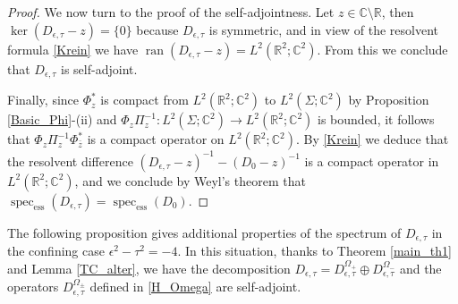 \documentclass[11pt,a4paper,reqno,oneside]{amsproc}
\DeclareMathOperator{\ran}{ran}
\DeclareMathOperator{\spec}{spec}
\newcommand{\spece}{\spec_\mathrm{ess}}
\def \rr {{\mathbb R}}
\def \cc {{\mathbb C}}
\numberwithin{equation}{section}
\def \cc {{\mathbb{C}}}
\begin{document}
\begin{proof}
We now turn to the proof of  the self-adjointness.  Let $z\in \cc\setminus\rr$, then $\ker (D_{\epsilon,\tau}-z)=\{0\}$ because $D_{\epsilon, \tau}$ is symmetric, and in view of the resolvent formula \eqref{Krein} we have $\ran (D_{\epsilon,\tau}-z)=L^2(\rr^2;\cc^2)$. From this we conclude that $D_{\epsilon,\tau}$ is self-adjoint. 

Finally,  since $\Phi_z^*$ is compact from $ L^2(\rr^2; \mathbb{C}^2)$ to $L^2(\Sigma; \mathbb{C}^2)$ by Proposition \ref{Basic_Phi}-(ii) and $\Phi_z\Pi_z^{-1}: L^2(\Sigma; \mathbb{C}^2) \rightarrow L^2(\rr^2; \mathbb{C}^2)$ is bounded,  it follows that $\Phi_z\Pi_z^{-1} \Phi_{\bar z}^*$ is a compact operator on $ L^2(\rr^2; \mathbb{C}^2)$.  By  \eqref{Krein} we deduce that the resolvent difference $(D_{\epsilon, \tau} - z)^{-1} - (D_0 - z)^{-1}$ is a compact operator in $ L^2(\rr^2; \mathbb{C}^2)$, and we conclude by  Weyl's theorem that $\spece (D_{\epsilon,\tau})=\spece (D_0)$. \end{proof}

The following proposition gives additional properties of the spectrum of $D_{\epsilon, \tau}$ in the confining case $\epsilon^2-\tau^2=-4$. In this situation, thanks to Theorem \ref{main_th1} and Lemma \ref{TC_alter},  we have the decomposition $D_{\epsilon, \tau}=D_{\epsilon,\tau}^{\Omega_+}\oplus D_{\epsilon,\tau}^{\Omega_-}$ and the operators $D_{\epsilon,\tau}^{\Omega_\pm}$ defined in \eqref{H_Omega} are self-adjoint.  
\end{document}
